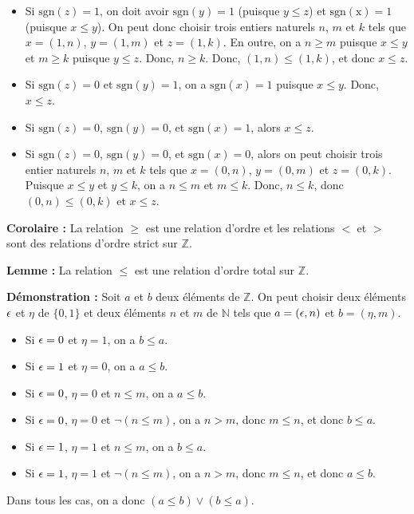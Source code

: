 \begin{itemize}[nosep]
\begin{itemize}[nosep]
            \item Si $\mathrm{sgn}(z) = 1$, on doit avoir $\mathrm{sgn}(y) = 1$ (puisque $y \leq z$) et $\mathrm{sgn(x)} = 1$ (puisque $x \leq y$). 
                On peut donc choisir trois entiers naturels $n$, $m$ et $k$ tels que $x = (1,n)$, $y = (1,m)$ et $z = (1,k)$. 
                En outre, on a $n \geq m$ puisque $x \leq y$ et $m \geq k$ puisque $y \leq z$. 
                Donc, $n \geq k$. 
                Donc, $(1,n) \leq (1,k)$, et donc $x \leq z$.
            \item Si $\mathrm{sgn}(z) = 0$ et $\mathrm{sgn}(y) = 1$, on a $\mathrm{sgn}(x) = 1$ puisque $x \leq y$.
                Donc, $x \leq z$.
            \item Si $\mathrm{sgn}(z) = 0$, $\mathrm{sgn}(y) = 0$, et $\mathrm{sgn}(x) = 1$, alors $x \leq z$.
            \item Si $\mathrm{sgn}(z) = 0$, $\mathrm{sgn}(y) = 0$, et $\mathrm{sgn}(x) = 0$, alors on peut choisir trois entier naturels $n$, $m$ et $k$ tels que $x = (0,n)$, $y = (0,m)$ et $z = (0,k)$.
                Puisque $x \leq y$ et $y \leq k$, on a $n \leq m$ et $m \leq k$. 
                Donc, $n \leq k$, donc $(0,n) \leq (0,k)$ et $x \leq z$.
        \end{itemize}
\end{itemize}

\done

\medskip

\noindent\textbf{Corolaire :} La relation $\geq$ est une relation d'ordre et les relations $<$ et $>$ sont des relations d'ordre strict sur $\mathbb{Z}$.

\medskip

\noindent\textbf{Lemme :} La relation $\leq$ est une relation d'ordre total sur $\mathbb{Z}$.

\medskip

\noindent\textbf{Démonstration :} Soit $a$ et $b$ deux éléments de $\mathbb{Z}$. 
    On peut choisir deux éléments $\epsilon$ et $\eta$ de $\lbrace 0, 1 \rbrace$ et deux éléments $n$ et $m$ de $\mathbb{N}$ tels que $a = (\epsilon, n)$ et $b = (\eta, m)$.
    \begin{itemize}[nosep]
        \item Si $\epsilon = 0$ et $\eta = 1$, on a $b \leq a$.
        \item Si $\epsilon = 1$ et $\eta = 0$, on a $a \leq b$.
        \item Si $\epsilon = 0$, $\eta = 0$ et $n \leq m$, on a $a \leq b$.
        \item Si $\epsilon = 0$, $\eta = 0$ et $\neg (n \leq m)$, on a $n > m$, donc $m \leq n$, et donc $b \leq a$.
        \item Si $\epsilon = 1$, $\eta = 1$ et $n \leq m$, on a $b \leq a$.
        \item Si $\epsilon = 1$, $\eta = 1$ et $\neg (n \leq m)$, on a $n > m$, donc $m \leq n$, et donc $a \leq b$.
    \end{itemize}
    Dans tous les cas, on a donc $(a \leq b) \vee (b \leq a)$.

